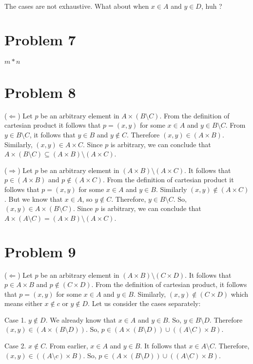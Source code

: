 \documentclass{article}
\begin{document}
The cases are not exhaustive. What about when $x \in A$ and $y \in D$,
huh ?

\section{Problem 7}

$ m * n$

\section{Problem 8}

($ \Leftarrow $) Let $p$ be an arbitrary element in $A \times (B
\setminus C)$. From the definition of cartesian product it follows
that $p = (x,y)$ for some $x \in A$ and $y \in B \setminus C$. From $y
\in B \setminus C$, it follows that $y \in B$ and $y \notin C$.
Therefore $(x,y) \in (A \times B)$. Similarly, $(x,y) \in A \times C$.
Since $p$ is arbitrary, we can conclude that $A \times (B \setminus C)
\subseteq (A \times B) \setminus (A \times C)$.

($ \Rightarrow $) Let $p$ be an arbitrary element in $(A \times B)
\setminus (A \times C)$. It follows that $p \in (A \times B)$ and $p
\notin (A \times C)$. From the definition of cartesian product it
follows that $p = (x,y)$ for some $x \in A$ and $y \in B$. Similarly
$(x,y) \notin (A \times C)$. But we know that $x \in A$, so $y \notin
C$. Therefore, $y \in B \setminus C$. So, $(x,y) \in A \times (B
\setminus C)$. Since $p$ is arbitrary, we can conclude that $A \times
(A \setminus C) = (A \times B) \setminus (A \times C)$.

\section{Problem 9}

($ \Leftarrow $) Let $p$ be an arbitrary element in $(A \times B)
\setminus (C \times D)$. It follows that $p \in A \times B$ and $p
\notin (C \times D)$. From the definition of cartesian product, it
follows that $p = (x,y)$ for some $x \in A$ and $y \in B$. Similarly,
$(x,y) \notin (C \times D)$ which means either $x \notin c$ or $y
\notin D$. Let us consider the cases separately:

Case 1. $y \notin D$. We already know that $x \in A$ and $y \in B$.
So, $y \in B \setminus D$. Therefore $(x,y) \in (A \times (B \setminus
D))$. So, $p \in (A \times (B \setminus D)) \cup ((A \setminus C) \times B)$.

Case 2. $x \notin C$. From earlier, $x \in A$ and $y\in B$. It follows
that $x \in A \setminus C$. Therefore, $(x,y) \in ((A \setminus c)
\times B)$. So, $p \in (A \times (B \setminus D)) \cup ((A \setminus
C) \times B)$.
\end{document}
